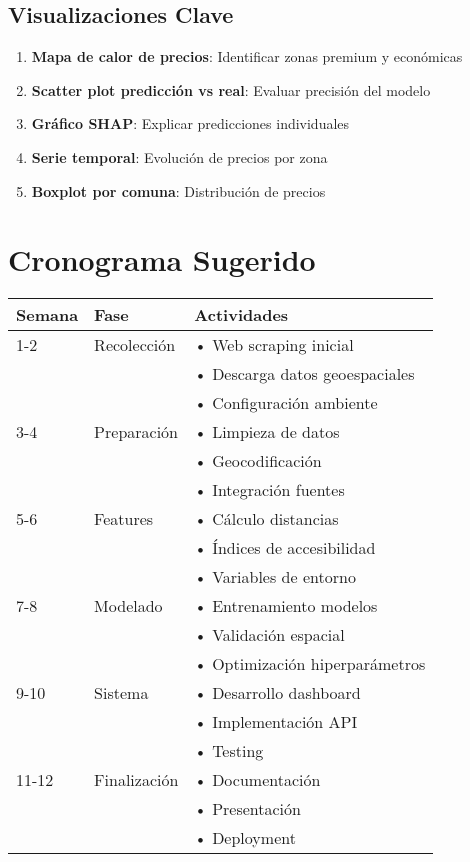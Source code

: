 \documentclass[11pt,a4paper]{article}
\begin{document}
\subsection{Visualizaciones Clave}

\begin{enumerate}
    \item \textbf{Mapa de calor de precios}: Identificar zonas premium y económicas
    \item \textbf{Scatter plot predicción vs real}: Evaluar precisión del modelo
    \item \textbf{Gráfico SHAP}: Explicar predicciones individuales
    \item \textbf{Serie temporal}: Evolución de precios por zona
    \item \textbf{Boxplot por comuna}: Distribución de precios
\end{enumerate}

\newpage

\section{Cronograma Sugerido}

\begin{table}[h]
\centering
\begin{tabular}{llp{6cm}}
\toprule
\textbf{Semana} & \textbf{Fase} & \textbf{Actividades} \\
\midrule
1-2 & Recolección & • Web scraping inicial\\
    &             & • Descarga datos geoespaciales\\
    &             & • Configuración ambiente\\
\midrule
3-4 & Preparación & • Limpieza de datos\\
    &             & • Geocodificación\\
    &             & • Integración fuentes\\
\midrule
5-6 & Features    & • Cálculo distancias\\
    &             & • Índices de accesibilidad\\
    &             & • Variables de entorno\\
\midrule
7-8 & Modelado    & • Entrenamiento modelos\\
    &             & • Validación espacial\\
    &             & • Optimización hiperparámetros\\
\midrule
9-10 & Sistema    & • Desarrollo dashboard\\
     &            & • Implementación API\\
     &            & • Testing\\
\midrule
11-12 & Finalización & • Documentación\\
      &              & • Presentación\\
      &              & • Deployment\\
\bottomrule
\end{tabular}
\end{table}
\end{document}
